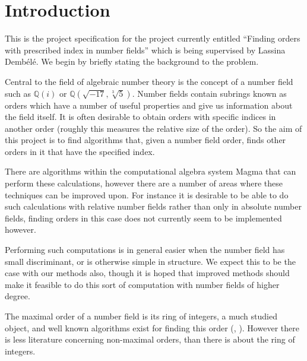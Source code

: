 \documentclass[11pt,a4paper]{article}
\begin{document}
\maketitle
\section*{Introduction}
This is the project specification for the project currently entitled ``Finding 
orders with prescribed index in number fields'' which is being supervised by 
Lassina Demb\'el\'e. We begin by briefly stating the background to the problem.


Central to the field of algebraic number theory is the concept of a number 
field such as $\mathbb{Q}(i)$ or $\mathbb{Q}(\sqrt{-17},\sqrt[3]{5})$.
Number fields contain subrings known as orders which have a number of useful
properties and give us information about the field itself.
It is often desirable to obtain orders with specific indices in another order
(roughly this measures the relative size of the order).
So the aim of this project is to find algorithms that, given a number field
order, finds other orders in it that have the specified index.


There are algorithms within the computational algebra system Magma that can 
perform these calculations, however there are a number of areas where these 
techniques can be improved upon.
For instance it is desirable to be able to do such calculations with relative
number fields rather than only in absolute number fields, finding orders in
this case does not currently seem to be implemented however.


Performing such computations is in general easier when the number field has
small discriminant, or is otherwise simple in structure.
We expect this to be the case with our methods also, though it is hoped that
improved methods should make it feasible to do this sort of computation with
number fields of higher degree.


The maximal order of a number field is its ring of integers, a much studied 
object, and well known algorithms exist for finding this order 
(\cite{Poh-Zas89}, \cite{Coh93}).
However there is less literature concerning non-maximal orders, than there 
is about the ring of integers.
\end{document}
